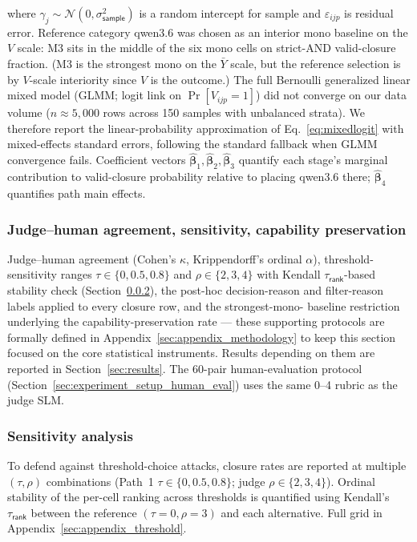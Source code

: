 where $\gamma_j \sim \mathcal{N}(0, \sigma_{\textsf{sample}}^2)$ is a random intercept for sample and $\varepsilon_{ijp}$ is residual error. Reference category qwen3.6 was chosen as an interior mono baseline on the $V$ scale: M3 sits in the middle of the six mono cells on strict-AND valid-closure fraction. (M3 is the strongest mono on the $\bar{Y}$ scale, but the reference selection is by $V$-scale interiority since $V$ is the outcome.) The full Bernoulli generalized linear mixed model (GLMM; logit link on $\Pr[V_{ijp} = 1]$) did not converge on our data volume ($n \approx 5{,}000$ rows across 150 samples with unbalanced strata). We therefore report the linear-probability approximation of Eq.~\ref{eq:mixedlogit} with mixed-effects standard errors, following the standard fallback when GLMM convergence fails. Coefficient vectors $\hat{\boldsymbol{\beta}}_1, \hat{\boldsymbol{\beta}}_2, \hat{\boldsymbol{\beta}}_3$ quantify each stage's marginal contribution to valid-closure probability relative to placing qwen3.6 there; $\hat{\boldsymbol{\beta}}_4$ quantifies path main effects.

\subsubsection{Judge--human agreement, sensitivity, capability preservation}
\label{sec:experiment_setup_supporting_methods}

Judge--human agreement (Cohen's $\kappa$, Krippendorff's ordinal $\alpha$),
threshold-sensitivity ranges $\tau \in \{0, 0.5, 0.8\}$ and $\rho \in \{2, 3, 4\}$
with Kendall $\tau_{\textsf{rank}}$-based stability check
(Section~\ref{sec:experiment_setup_sensitivity}), the post-hoc decision-reason
and filter-reason labels applied to every closure row, and the strongest-mono-
baseline restriction underlying the capability-preservation rate --- these
supporting protocols are formally defined in
Appendix~\ref{sec:appendix_methodology} to keep this section focused on the
core statistical instruments. Results depending on them are reported in
Section~\ref{sec:results}. The 60-pair human-evaluation protocol
(Section~\ref{sec:experiment_setup_human_eval}) uses the same 0--4 rubric
as the judge SLM.

\subsubsection{Sensitivity analysis}
\label{sec:experiment_setup_sensitivity}

To defend against threshold-choice attacks, closure rates are reported at
multiple $(\tau, \rho)$ combinations (Path~1 $\tau \in \{0, 0.5, 0.8\}$;
judge $\rho \in \{2, 3, 4\}$). Ordinal stability of the per-cell ranking
across thresholds is quantified using Kendall's $\tau_{\textsf{rank}}$
between the reference $(\tau = 0, \rho = 3)$ and each alternative. Full grid
in Appendix~\ref{sec:appendix_threshold}.

